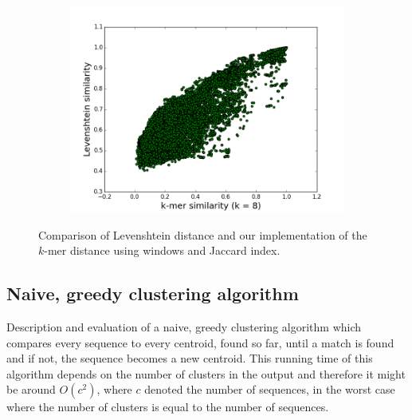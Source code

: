\begin{figure}
  \centering
        \begin{subfigure}[b]{0.5\textwidth}
        \includegraphics[scale=0.34]{graphics/k8.png}
        \end{subfigure}
\caption{Comparison of Levenshtein distance and our implementation of the
$k$-mer distance using windows and Jaccard index.}
\label{fig:Levenshtein_vs_Kmer}
\end{figure}


\subsection{Naive, greedy clustering algorithm} %
Description and evaluation of a naive, greedy clustering algorithm which
compares every sequence to every centroid, found so far, until a match is found
and if not, the sequence becomes a new centroid. This running time of this
algorithm depends on the number of clusters in the output and therefore it
might be around $O(c^2)$, where $c$ denoted the number of sequences, in the
worst case where the number of clusters is equal to the number of sequences.  %


